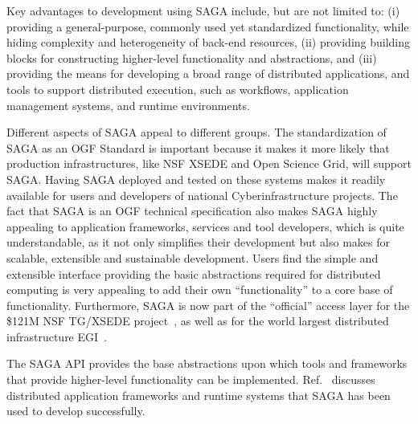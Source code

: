 \documentclass[]{svjour3}
\begin{document}
Key advantages to development using SAGA include, but are not limited to:
(i) providing a general-purpose, commonly used yet standardized functionality, while
hiding complexity and heterogeneity of back-end resources, (ii)
providing building blocks for constructing higher-level functionality
and abstractions, and (iii) providing the means for developing a broad
range of distributed applications, and tools to support distributed
execution, such as workflows, application management systems, and runtime environments.

Different aspects of SAGA appeal to different groups. The
standardization of SAGA as an OGF Standard is important because it
makes it more likely that production infrastructures, like NSF XSEDE
and Open Science Grid, will support SAGA. Having SAGA deployed and
tested on these systems makes it readily available for users and
developers of national Cyberinfrastructure projects. The fact that
SAGA is an OGF technical specification also makes SAGA highly
appealing to application frameworks, services and tool developers,
which is quite understandable, as it not only simplifies their
development but also makes for scalable, extensible and sustainable
development. Users find the simple and extensible interface providing
the basic abstractions required for distributed computing is very
appealing to add their own “functionality” to a core base of
functionality. Furthermore, SAGA is now part of the “official” access
layer for the \$121M NSF TG/XSEDE project~\cite{XSEDE}, as well as for
the world largest distributed infrastructure EGI~\cite{EGI}.

The SAGA API provides the base abstractions upon which tools and
frameworks that provide higher-level functionality can be
implemented. Ref.~\cite{saga_url} discusses distributed application
frameworks and runtime systems that SAGA has been used to develop
successfully. 
\end{document}
